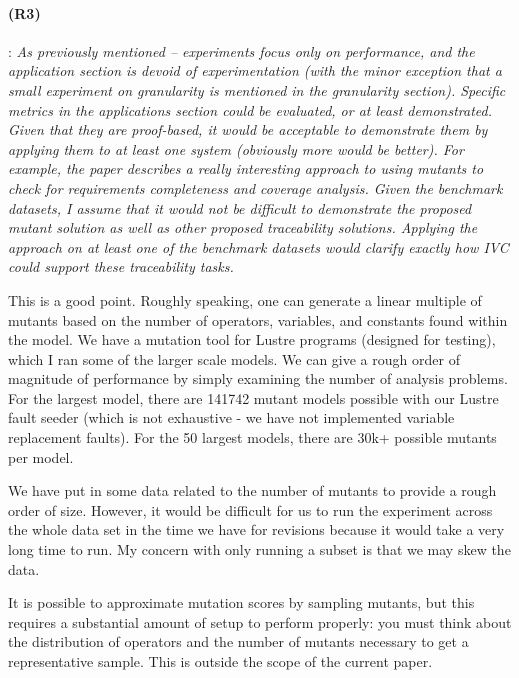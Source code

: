 \documentclass{article}
\begin{document}
\paragraph{(R3)}: \textit{As previously mentioned -- experiments focus only on performance, and the application section is devoid of experimentation (with the minor exception that a small experiment on granularity is mentioned in the granularity section). Specific metrics in the applications section could be evaluated, or at least demonstrated. Given that they are proof-based, it would be acceptable to demonstrate them by applying them to at least one system (obviously more would be better). For example, the paper describes a really interesting approach to using mutants to check for requirements completeness and coverage analysis. Given the benchmark datasets, I assume that it would not be difficult to demonstrate the proposed mutant solution as well as other proposed traceability solutions. Applying the approach on at least one of the benchmark datasets would clarify exactly how IVC could support these traceability tasks.}
\vspace{0.05in}

This is a good point.  Roughly speaking, one can generate a linear multiple of mutants based on the number of operators, variables, and constants found within the model.  We have a mutation tool for Lustre programs (designed for testing), which I ran some of the larger scale models.  We can give a rough order of magnitude of performance by simply examining the number of analysis problems.  For the largest model, there are 141742 mutant models possible with our Lustre fault seeder (which is not exhaustive - we have not implemented variable replacement faults).   For the 50 largest models, there are 30k+ possible mutants per model.

We have put in some data related to the number of mutants to provide a rough order of size.  However, it would be difficult for us to run the experiment across the whole data set in the time we have for revisions because it would take a very long time to run.  My concern with only running a subset is that we may skew the data.

It is possible to approximate mutation scores by sampling mutants, but this requires a substantial amount of setup to perform properly: you must think about the distribution of operators and the number of mutants necessary to get a representative sample.  This is outside the scope of the current paper.
\end{document}
